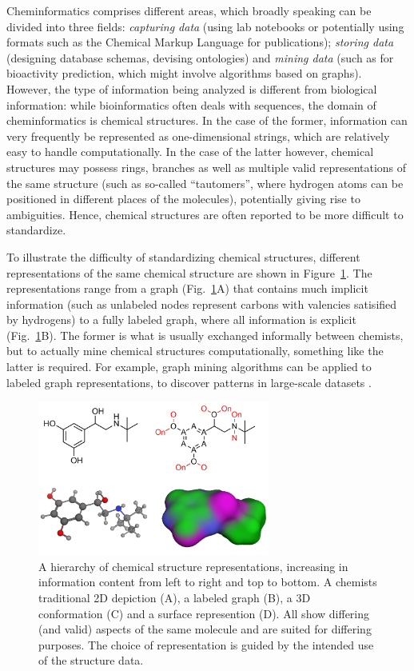 \documentclass{sig-alternate}
\begin{document}
Cheminformatics comprises different areas, which broadly speaking can
be divided into three fields: \emph{capturing data} (using lab
notebooks or potentially using formats such as the Chemical Markup
Language for publications); \emph{storing data} (designing database
schemas, devising ontologies) and \emph{mining data} (such as for
bioactivity prediction, which might involve algorithms based on
graphs).  However, the type of information being analyzed is different
from biological information: while bioinformatics often deals with
sequences, the domain of cheminformatics is chemical structures. In
the case of the former, information can very frequently be represented
as one-dimensional strings, which are relatively easy to handle
computationally. In the case of the latter however, chemical
structures may possess rings, branches as well as multiple valid
representations of the same structure (such as so-called
``tautomers'', where hydrogen atoms can be positioned in different
places of the molecules), potentially giving rise to
ambiguities. Hence, chemical structures are often reported to be more
difficult to standardize.

To illustrate the difficulty of standardizing chemical structures,
different representations of the same chemical structure are shown in
Figure~\ref{figure:chemical-structures}. The representations range
from a graph (Fig.~\ref{figure:chemical-structures}A) that contains
much implicit information (such as unlabeled nodes represent carbons
with valencies satisified by hydrogens) to a fully labeled graph,
where all information is explicit
(Fig.~\ref{figure:chemical-structures}B). The former is what is
usually exchanged informally between chemists, but to actually mine
chemical structures computationally, something like the latter is
required.  For example, graph mining algorithms can be applied to
labeled graph representations, to discover patterns in large-scale
datasets \cite{horst2009}.

\begin{figure}
\centering
\includegraphics[height=2in]{chemical-structures.png}
\caption{A hierarchy of chemical structure representations, increasing
  in information content from left to right and top to bottom. A
  chemists traditional 2D depiction (A), a labeled graph (B), a 3D
  conformation (C) and a surface represention (D). All show differing
  (and valid) aspects of the same molecule and are suited for
  differing purposes. The choice of representation is guided by the
  intended use of the structure data.}
\label{figure:chemical-structures}
\end{figure}
\end{document}
